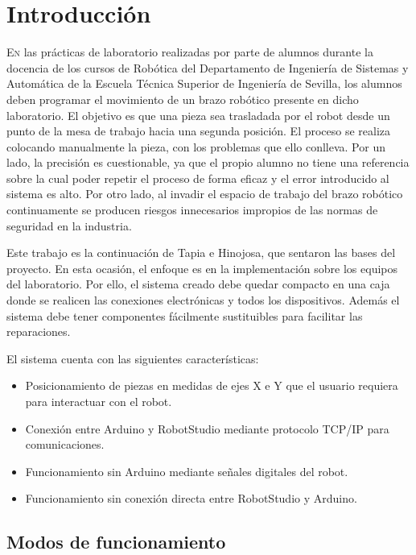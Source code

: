 \chapter{Introducción}\label{chp-01}


\lettrine[lraise=-0.1, lines=2, loversize=0.2]{E}{n} las prácticas de laboratorio realizadas
por parte de alumnos durante la docencia de los cursos de Robótica del Departamento de Ingeniería
de Sistemas y Automática de la Escuela Técnica Superior de Ingeniería de Sevilla, los alumnos
deben programar el movimiento de un brazo robótico presente en dicho laboratorio. El objetivo
es que una pieza sea trasladada por el robot desde un punto de la mesa de trabajo hacia una
segunda posición. El proceso se realiza colocando manualmente la pieza, con los problemas que
ello conlleva. Por un lado, la precisión es cuestionable, ya que el propio alumno no tiene una
referencia sobre la cual poder repetir el proceso de forma eficaz y el error introducido al sistema
es alto. Por otro lado, al invadir el espacio de trabajo del brazo robótico continuamente se
producen riesgos innecesarios impropios de las normas de seguridad en la industria.

Este trabajo es la continuación de Tapia\cite{tapia} e Hinojosa\cite{rea}, que sentaron las bases del proyecto.
En esta ocasión, el enfoque es en la implementación sobre los equipos del laboratorio. Por ello,
el sistema creado debe quedar compacto en una caja donde se realicen las conexiones electrónicas y todos
los dispositivos. Además el sistema debe tener componentes fácilmente sustituibles para facilitar
las reparaciones.

El sistema cuenta con las siguientes características:
\begin{itemize}
	\item Posicionamiento de piezas en medidas de ejes X e Y que el usuario requiera para 
	interactuar con el robot.
	\item Conexión entre Arduino y RobotStudio mediante protocolo TCP/IP para comunicaciones.
	\item Funcionamiento sin Arduino mediante señales digitales del robot.
	\item Funcionamiento sin conexión directa entre RobotStudio y Arduino.
\end{itemize}

\section{Modos de funcionamiento}\label{sec-00}

